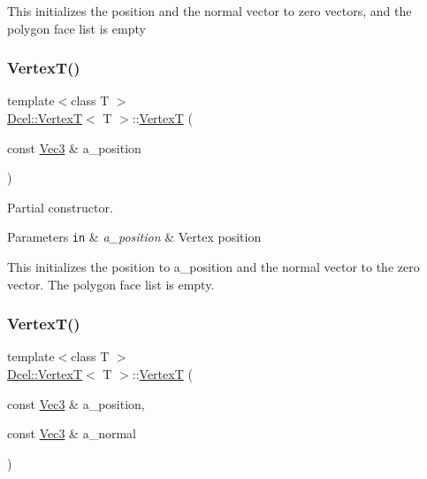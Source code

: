 This initializes the position and the normal vector to zero vectors, and the polygon face list is empty \mbox{\label{classDcel_1_1VertexT_ade01d01c6a145c31c6f46dccc902cfae}} 
\subsubsection{\texorpdfstring{Vertex\+T()}{VertexT()}\hspace{0.1cm}{\footnotesize\ttfamily [2/4]}}
{\footnotesize\ttfamily template$<$class T $>$ \\
\hyperlink{classDcel_1_1VertexT}{Dcel\+::\+VertexT}$<$ T $>$\+::\hyperlink{classDcel_1_1VertexT}{VertexT} (\begin{DoxyParamCaption}\item[{const \hyperlink{classDcel_1_1VertexT_a6e073dc7426756edef5594816be6e7c7}{Vec3} \&}]{a\+\_\+position }\end{DoxyParamCaption})\hspace{0.3cm}{\ttfamily [inline]}}



Partial constructor. 


\begin{DoxyParams}[1]{Parameters}
\mbox{\tt in}  & {\em a\+\_\+position} & Vertex position\\
\hline
\end{DoxyParams}
This initializes the position to a\+\_\+position and the normal vector to the zero vector. The polygon face list is empty. \mbox{\label{classDcel_1_1VertexT_a90d3c97e605b8084667a85ddfb4ba8bc}} 
\subsubsection{\texorpdfstring{Vertex\+T()}{VertexT()}\hspace{0.1cm}{\footnotesize\ttfamily [3/4]}}
{\footnotesize\ttfamily template$<$class T $>$ \\
\hyperlink{classDcel_1_1VertexT}{Dcel\+::\+VertexT}$<$ T $>$\+::\hyperlink{classDcel_1_1VertexT}{VertexT} (\begin{DoxyParamCaption}\item[{const \hyperlink{classDcel_1_1VertexT_a6e073dc7426756edef5594816be6e7c7}{Vec3} \&}]{a\+\_\+position,  }\item[{const \hyperlink{classDcel_1_1VertexT_a6e073dc7426756edef5594816be6e7c7}{Vec3} \&}]{a\+\_\+normal }\end{DoxyParamCaption})\hspace{0.3cm}{\ttfamily [inline]}}



